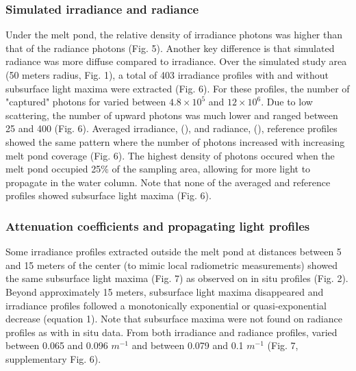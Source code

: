 \subsubsection{Simulated irradiance and radiance}

Under the melt pond, the relative density of irradiance photons was higher than that of the radiance photons (Fig. 5). Another key difference is that simulated radiance was more diffuse compared to irradiance. Over the simulated study area (50 meters radius, Fig. 1), a total of 403 irradiance profiles with and without subsurface light maxima were extracted (Fig. 6).  For these profiles, the number of "captured" photons for \ed{} varied between $4.8 \times 10^5$ and $12 \times 10^6$. Due to low scattering, the number of upward photons was much lower and ranged between 25 and 400 (Fig. 6). Averaged irradiance, (\meanedz{}), and radiance, (\meanluz{}), reference profiles showed the same pattern where the number of photons increased with increasing melt pond coverage (Fig. 6). The highest density of photons occured when the melt pond occupied 25\% of the sampling area, allowing for more light to propagate in the water column. Note that none of the averaged \meanedz{} and \meanluz{} reference profiles showed subsurface light maxima (Fig. 6).

\subsubsection{Attenuation coefficients and propagating light profiles}

Some irradiance profiles extracted outside the melt pond at distances between 5 and 15 meters of the center (to mimic local radiometric measurements) showed the same subsurface light maxima (Fig. 7) as observed on in situ profiles (Fig. 2). Beyond approximately 15 meters, subsurface light maxima disappeared and irradiance profiles followed a monotonically exponential or quasi-exponential decrease (equation 1). Note that subsurface maxima were not found on radiance profiles as with in situ data. From both irradiance and radiance profiles, \ked{} varied between 0.065 and 0.096 $m^{-1}$ and \klu{} between 0.079 and 0.1 $m^{-1}$ (Fig. 7, supplementary Fig. 6).

